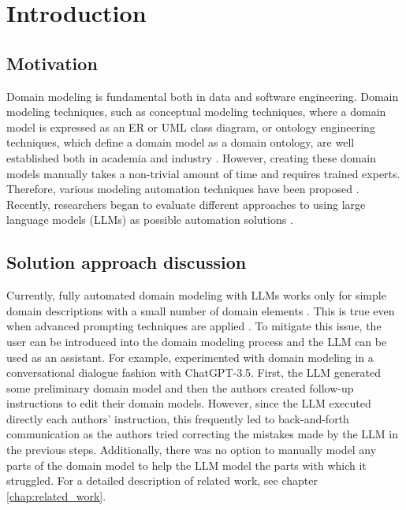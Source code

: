 \chapter*{Introduction}


\section*{Motivation}

Domain modeling is fundamental both in data and software engineering. Domain modeling techniques, such as conceptual modeling techniques, where a domain model is expressed as an ER or UML class diagram, or ontology engineering techniques, which define a domain model as a domain ontology, are well established both in academia and industry \cite{Verdonck2018}. However, creating these domain models manually takes a non-trivial amount of time and requires trained experts. Therefore, various modeling automation techniques have been proposed \cite{Sonbol2022}. Recently, researchers began to evaluate different approaches to using large language models (LLMs) as possible automation solutions \cite{Chen2023,Saeedizade2024}.


\section*{Solution approach discussion}

Currently, fully automated domain modeling with LLMs works only for simple domain descriptions with a small number of domain elements \cite{Camara2023}. This is true even when advanced prompting techniques are applied \cite{Chen2023,Saeedizade2024}. To mitigate this issue, the user can be introduced into the domain modeling process \cite{Camara2023} and the LLM can be used as an assistant. For example, \citet{Camara2023} experimented with domain modeling in a conversational dialogue fashion with ChatGPT-3.5. First, the LLM generated some preliminary domain model and then the authors created follow-up instructions to edit their domain models. However, since the LLM executed directly each authors' instruction, this frequently led to back-and-forth communication as the authors tried correcting the mistakes made by the LLM in the previous steps. Additionally, there was no option to manually model any parts of the domain model to help the LLM model the parts with which it struggled. For a detailed description of related work, see chapter \ref{chap:related_work}.


